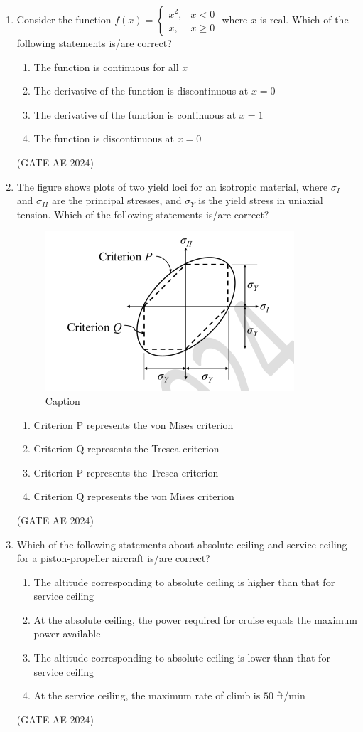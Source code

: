 \documentclass[journal,12pt,onecolumn]{IEEEtran}
\theoremstyle{remark}
\begin{document}
\begin{enumerate}
\item Consider the function  
$
f(x) =
\begin{cases}
x^2, & x < 0 \\
x, & x \ge 0
\end{cases}
$
where $x$ is real. Which of the following statements is/are correct?  
\begin{enumerate}
\item The function is continuous for all $x$  
\item The derivative of the function is discontinuous at $x = 0$  
\item The derivative of the function is continuous at $x = 1$  
\item The function is discontinuous at $x = 0$  
\end{enumerate}
\hfill(GATE AE 2024)

\item The figure shows plots of two yield loci for an isotropic material, where $\sigma_I$ and $\sigma_{II}$ are the principal stresses, and $\sigma_Y$ is the yield stress in uniaxial tension. Which of the following statements is/are correct?
\begin{figure}[H]
    \centering
    \includegraphics[width=0.5\columnwidth]{figs/Screenshot 2025-08-24 061903.png}
    \caption{Caption}
    \label{fig:placeholder}
\end{figure}
\begin{enumerate}
    \item Criterion P represents the von Mises criterion
    \item Criterion Q represents the Tresca criterion
    \item Criterion P represents the Tresca criterion
    \item Criterion Q represents the von Mises criterion
\end{enumerate}
\hfill(GATE AE 2024)

\item Which of the following statements about absolute ceiling and service ceiling for a piston-propeller aircraft is/are correct?
\begin{enumerate}
    \item The altitude corresponding to absolute ceiling is higher than that for service ceiling
    \item At the absolute ceiling, the power required for cruise equals the maximum power available
    \item The altitude corresponding to absolute ceiling is lower than that for service ceiling
    \item At the service ceiling, the maximum rate of climb is $50$ ft/min
\end{enumerate}
\hfill(GATE AE 2024)


\end{enumerate}
\end{document}
